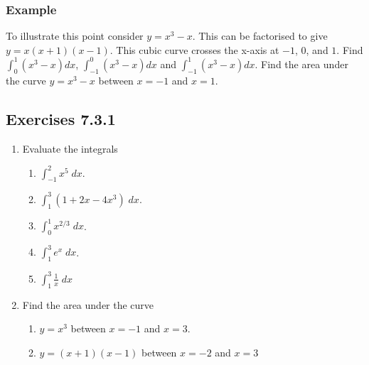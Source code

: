\subsubsection{Example}
To illustrate this point consider $y =x^{3} -x$. This can be factorised to give $y =x (x +1) (x -1)$. This cubic curve crosses the x-axis at $ -1$, $0$, and $1$. Find $\int _{0}^{1}(x^{3} -x) d x$, $\int _{ -1}^{0}(x^{3} -x) d x$ and $\int _{ -1}^{1}(x^{3} -x) d x$. Find the area under the curve $y =x^{3} -x$ between $x = -1$ and $x =1$. 

\subsection{Exercises 7.3.1}
\begin{enumerate}
\item Evaluate the integrals 
\begin{enumerate}
\item $\int _{ -1}^{2}x^{5}\; d x$. 

\item $\int _{1}^{3}\left (1 +2 x -4 x^{3}\right )\; d x$. 

\item $\int _{0}^{1}x^{2/3}\; d x$. 

\item $\int _{1}^{3}e^{x}\; d x$. 

\item $\int _{1}^{3}\frac{1}{x}\; d x$ \end{enumerate}

\item Find the area under the curve
\begin{enumerate}
\item $y =x^{3}$ between $x = -1$ and $x =3$. 

\item $y =\left (x +1\right ) \left (x -1\right )$ between $x = -2$ and $x =3$ \end{enumerate}
\end{enumerate}
